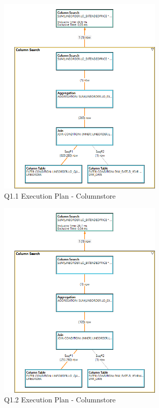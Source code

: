 \begin{figure}[H]
	\centering
	\includegraphics[width=0.7\textwidth]{images/q1-1-col-exec.png}
	\caption{Q1.1 Execution Plan - Columnstore}\label{exec:q1.1-col}
\end{figure}
\begin{figure}[H]
	\centering
	\includegraphics[width=0.7\textwidth]{images/q1-2-col-exec.png}
	\caption{Q1.2 Execution Plan - Columnstore}\label{exec:q1.2-col}
\end{figure}
